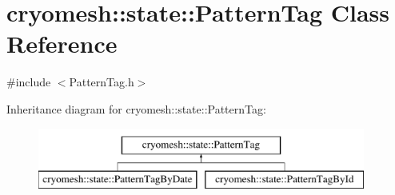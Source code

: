 \hypertarget{classcryomesh_1_1state_1_1PatternTag}{\section{cryomesh\-:\-:state\-:\-:\-Pattern\-Tag \-Class \-Reference}
\label{classcryomesh_1_1state_1_1PatternTag}
}


{\ttfamily \#include $<$\-Pattern\-Tag.\-h$>$}

\-Inheritance diagram for cryomesh\-:\-:state\-:\-:\-Pattern\-Tag\-:\begin{figure}[H]
\begin{center}
\leavevmode
\includegraphics[height=2.000000cm]{classcryomesh_1_1state_1_1PatternTag}
\end{center}
\end{figure}
